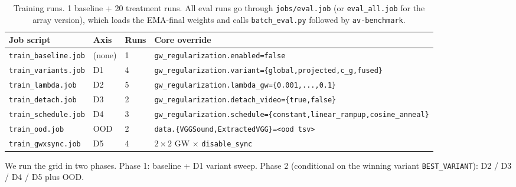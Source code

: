 \begin{table}[t]
\centering
\small
\begin{tabular}{@{}llll@{}}
\toprule
Job script & Axis & Runs & Core override \\
\midrule
\texttt{train\_baseline.job} & (none)   & 1 & \texttt{gw\_regularization.enabled=false} \\
\texttt{train\_variants.job} & D1       & 4 & \texttt{gw\_regularization.variant=\{global,projected,c\_g,fused\}} \\
\texttt{train\_lambda.job}   & D2       & 5 & \texttt{gw\_regularization.lambda\_gw=\{0.001,...,0.1\}} \\
\texttt{train\_detach.job}   & D3       & 2 & \texttt{gw\_regularization.detach\_video=\{true,false\}} \\
\texttt{train\_schedule.job} & D4       & 3 & \texttt{gw\_regularization.schedule=\{constant,linear\_rampup,cosine\_anneal\}} \\
\texttt{train\_ood.job}      & OOD      & 2 & \texttt{data.\{VGGSound,ExtractedVGG\}=<ood tsv>} \\
\texttt{train\_gwxsync.job}  & D5       & 4 & $2\times 2$ GW $\times$ \texttt{disable\_sync} \\
\bottomrule
\end{tabular}
\caption{Training runs. 1 baseline + 20 treatment runs. All
eval runs go through \texttt{jobs/eval.job} (or
\texttt{eval\_all.job} for the array version), which loads the
EMA-final weights and calls \texttt{batch\_eval.py} followed by
\texttt{av-benchmark}.}
\label{tab:grid}
\end{table}

We run the grid in two phases. Phase 1: baseline + D1 variant
sweep. Phase 2 (conditional on the winning variant
\texttt{BEST\_VARIANT}): D2 / D3 / D4 / D5 plus OOD.

